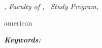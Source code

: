 {%
    
    \begin{center}
        \namaMahasiswa \\
        \texttt{\emailref{\emailKorespondensi}}
        
        \textit{\textbf{\MakeUppercase{\judulENG}}}
        
        \textit{\utDaerah, Faculty of \fakultasENG, \programStudiENG\ Study Program, \tahun}
    \end{center}
    
    \vspace{0.4cm}
    
    \begin{otherlanguage*}{american}
    \noindent\textit{\abstrakENG}
    
    \vspace{0.4cm}
    
    \noindent\textit{\textbf{Keywords:} \kataKunciENG}
    \end{otherlanguage*}
}

